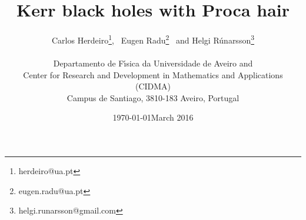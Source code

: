 \documentclass{article}
\date{\today}
\numberwithin{equation}{section}
\begin{document}




\title{\bf \Large Kerr black holes with Proca hair}

 \author{
{\large Carlos Herdeiro}\footnote{herdeiro@ua.pt}, \
{\large Eugen Radu}\footnote{eugen.radu@ua.pt} \
and
{\large Helgi R\'unarsson}\footnote{helgi.runarsson@gmail.com}
\\ 
\\
{\small Departamento de F\'\i sica da Universidade de Aveiro and} \\ 
{\small Center for Research and Development in Mathematics and Applications (CIDMA)} \\ 
{\small   Campus de Santiago, 3810-183 Aveiro, Portugal}
}


 
 

\date{March 2016}
\maketitle
\end{document}
